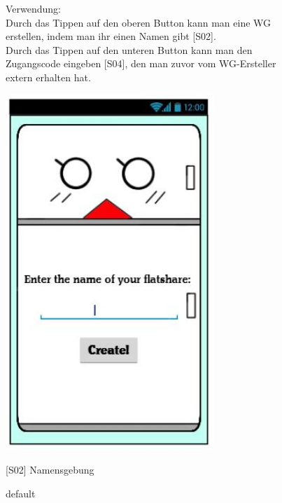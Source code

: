 \documentclass[a4paper]{scrreprt}
\begin{document}
\begin{figure}[h]
\begin{minipage}[b]{0.55\linewidth}
        		Verwendung:\\
        		Durch das Tippen auf den oberen Button
        		kann man eine WG erstellen, indem man ihr
        		einen Namen gibt {[}S02{]}.\\
        		Durch das Tippen auf den unteren Button kann
        		man den Zugangscode eingeben {[}S04{]}, den man zuvor vom WG-Ersteller extern erhalten 
        		hat.
        		
        	\end{minipage}
        \end{figure}
    
    	\begin{figure}[h!]
    		\begin{minipage}[t]{0.4\linewidth}
    			\flushright
    			\centering
    			\vspace{9mm}
    			\includegraphics[width=0.7\textwidth]{fridget_nameenter.JPG}
    			\caption{default}
    			\label{fig:figure1}
    		\end{minipage}
    		\hspace{0.5cm}
    		\begin{minipage}[t]{0.55\linewidth}
    			\flushleft
    			\vspace{9mm}
    			{[}S02{]} Namensgebung
    			

\end{minipage}
\end{figure}
\end{document}
